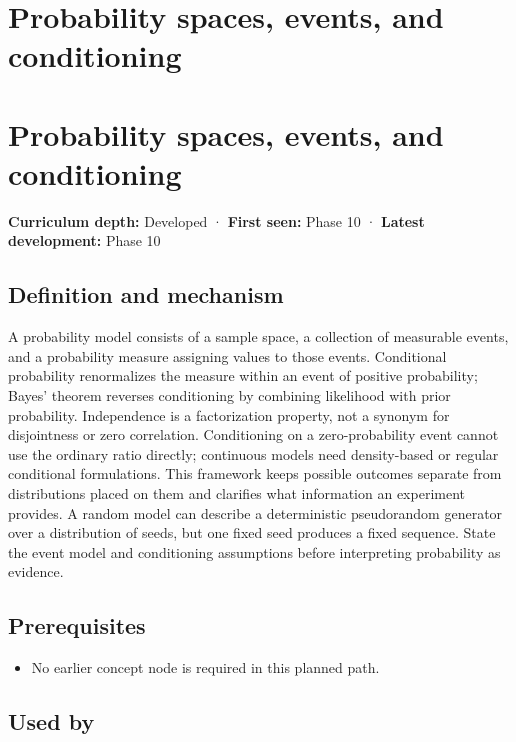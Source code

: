 \hypertarget{appendix-f1ef323f6ed7}{}
\section*{Probability spaces, events, and conditioning}
\section{Probability spaces, events, and conditioning}\label{appendix-f1ef323f6ed7-probability-spaces-events-and-conditioning}

\textbf{Curriculum depth:} Developed · \textbf{First seen:} Phase 10 · \textbf{Latest development:} Phase 10

\subsection{Definition and mechanism}\label{appendix-f1ef323f6ed7-definition-and-mechanism}

A probability model consists of a sample space, a collection of measurable events, and a probability measure assigning values to those events. Conditional probability renormalizes the measure within an event of positive probability; Bayes' theorem reverses conditioning by combining likelihood with prior probability. Independence is a factorization property, not a synonym for disjointness or zero correlation. Conditioning on a zero-probability event cannot use the ordinary ratio directly; continuous models need density-based or regular conditional formulations. This framework keeps possible outcomes separate from distributions placed on them and clarifies what information an experiment provides. A random model can describe a deterministic pseudorandom generator over a distribution of seeds, but one fixed seed produces a fixed sequence. State the event model and conditioning assumptions before interpreting probability as evidence.

\subsection{Prerequisites}\label{appendix-f1ef323f6ed7-prerequisites}

\begin{itemize}
\tightlist
\item
  No earlier concept node is required in this planned path.
\end{itemize}

\subsection{Used by}\label{appendix-f1ef323f6ed7-used-by}

